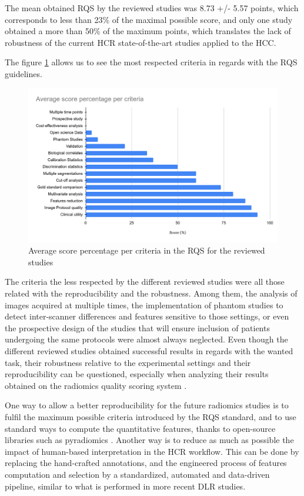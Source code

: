 \documentclass[]{article}
\begin{document}


The mean obtained RQS by the reviewed studies was 8.73 +/- 5.57
points, which corresponds to less than 23\% of the maximal possible
score, and only one study obtained a more than 50\% of the maximum
points, which translates the lack of robustness of the current
HCR state-of-the-art studies applied to the HCC.

The figure \ref{RQS_points_per_criteria} allows us to see the most respected criteria in regards
with the RQS guidelines.


\begin{figure}[th!]
\centering
\includegraphics[width=0.7\linewidth]{images/image13}
\caption{Average score percentage per criteria in the RQS for the reviewed studies}
\label{RQS_points_per_criteria}
\end{figure}


The criteria the less respected by the different reviewed studies were
all those related with the reproducibility and the robustness. Among
them, the analysis of images acquired at multiple times, the
implementation of phantom studies to detect inter-scanner differences
and features sensitive to those settings, or even the prospective design
of the studies that will ensure inclusion of patients undergoing the
same protocols were almost always neglected.
Even though the different reviewed studies obtained successful results
in regards with the wanted task, their robustness relative to the
experimental settings and their reproducibility can be questioned,
especially when analyzing their results obtained on the radiomics
quality scoring system \cite{Lambin2017}.

One way to allow a better reproducibility for the future radiomics
studies is to fulfil the maximum possible criteria introduced by the
RQS standard, and to use standard ways to compute the
quantitative features, thanks to open-source libraries such as
pyradiomics \cite{VanGriethuysen2017}. Another way is to reduce as much
as possible the impact of human-based interpretation in the HCR
workflow. This can be done by replacing the hand-crafted annotations,
and the engineered process of features computation and selection by a
standardized, automated and data-driven pipeline, similar to what is
performed in more recent DLR studies.
\end{document}
